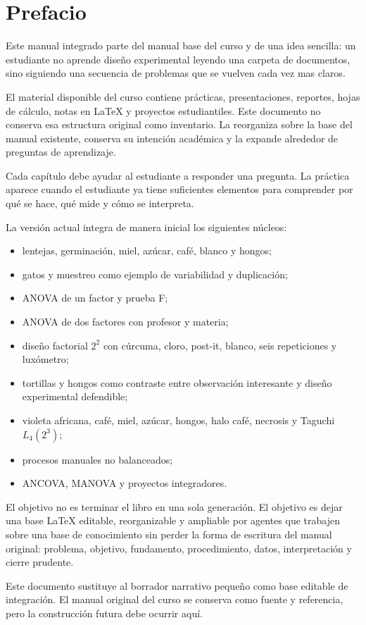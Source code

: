 \chapter*{Prefacio}

Este manual integrado parte del manual base del curso y de una idea sencilla: un estudiante no aprende diseño experimental leyendo una carpeta de documentos, sino siguiendo una secuencia de problemas que se vuelven cada vez mas claros.

El material disponible del curso contiene prácticas, presentaciones, reportes, hojas de cálculo, notas en \LaTeX{} y proyectos estudiantiles. Este documento no conserva esa estructura original como inventario. La reorganiza sobre la base del manual existente, conserva su intención académica y la expande alrededor de preguntas de aprendizaje.

\begin{idea}
Cada capítulo debe ayudar al estudiante a responder una pregunta. La práctica aparece cuando el estudiante ya tiene suficientes elementos para comprender por qué se hace, qué mide y cómo se interpreta.
\end{idea}

La versión actual integra de manera inicial los siguientes núcleos:

\begin{itemize}
  \item lentejas, germinación, miel, azúcar, café, blanco y hongos;
  \item gatos y muestreo como ejemplo de variabilidad y duplicación;
  \item ANOVA de un factor y prueba F;
  \item ANOVA de dos factores con profesor y materia;
  \item diseño factorial \(2^2\) con cúrcuma, cloro, post-it, blanco, seis repeticiones y luxómetro;
  \item tortillas y hongos como contraste entre observación interesante y diseño experimental defendible;
  \item violeta africana, café, miel, azúcar, hongos, halo café, necrosis y Taguchi \(L_4(2^3)\);
  \item procesos manuales no balanceados;
  \item ANCOVA, MANOVA y proyectos integradores.
\end{itemize}

El objetivo no es terminar el libro en una sola generación. El objetivo es dejar una base \LaTeX{} editable, reorganizable y ampliable por agentes que trabajen sobre una base de conocimiento sin perder la forma de escritura del manual original: problema, objetivo, fundamento, procedimiento, datos, interpretación y cierre prudente.

\begin{cuidado}
Este documento sustituye al borrador narrativo pequeño como base editable de integración. El manual original del curso se conserva como fuente y referencia, pero la construcción futura debe ocurrir aquí.
\end{cuidado}
